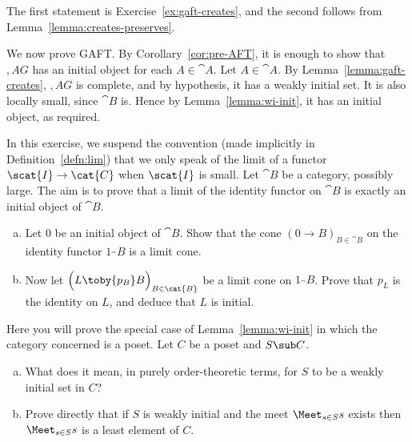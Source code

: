 \begin{pf}
The first statement is
Exercise~\ref{ex:gaft-creates}, and the
second follows from Lemma~\ref{lemma:creates-preserves}.
\end{pf}

We now prove GAFT.  By Corollary~\ref{cor:pre-AFT}, it is enough to show
that $\comma{A}{G}$ has an initial object for each $A \in \cat{A}$.  Let $A
\in \cat{A}$.  By Lemma~\ref{lemma:gaft-creates}, $\comma{A}{G}$ is
complete, and by hypothesis, it has a weakly initial set.  It is also
locally small, since $\cat{B}$ is.  Hence by Lemma~\ref{lemma:wi-init}, it
has an initial object, as required.


\exs


\begin{aquestion}        
\label{ex:lim-of-id}
In this exercise, we suspend the convention (made implicitly in
Definition~\ref{defn:lim}) that we only speak of the limit of a functor
$\scat{I} \to \cat{C}$ when $\scat{I}$ is small.%
%
%
%
Let $\cat{B}$ be a
category, possibly large.  The aim is to prove that a limit%
%
%
%
% 
of the identity functor on $\cat{B}$ is exactly an initial object of
$\cat{B}$.
% 
\begin{enumerate}[(b)]
\item 
Let $0$ be an initial object of $\cat{B}$.  Show that the cone $(0 \to
B)_{B \in \cat{B}}$ on the identity functor $1_\cat{B}$ is a limit cone.

\item
Now let $\Bigl(L \toby{p_B} B\Bigr)_{B \in \cat{B}}$ be a limit cone on
$1_\cat{B}$.  Prove that $p_L$ is the identity on $L$, and deduce that $L$
is initial.  
\end{enumerate}
\end{aquestion}


\begin{aquestion}        
\label{ex:wi-poset}
Here you will prove the special case of Lemma~\ref{lemma:wi-init} in which
the category concerned is a poset.  Let $C$ be a poset and $S \sub C$.
% 
\begin{enumerate}[(b)]
\item 
What does it mean, in purely order-theoretic terms, for $S$ to be a weakly
initial set in $C$?

\item 
Prove directly that if $S$ is weakly initial and the meet $\Meet_{s \in S}
s$ exists then $\Meet_{s \in S} s$ is a least%
%
%
element of $C$.%
%
%
%
\end{enumerate}
\end{aquestion}


